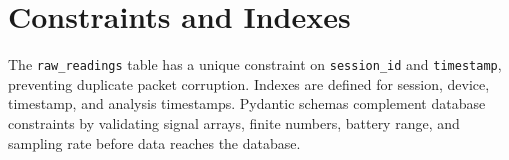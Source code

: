 \section{Constraints and Indexes}

The \texttt{raw\_readings} table has a unique constraint on \texttt{session\_id} and \texttt{timestamp}, preventing duplicate packet corruption. Indexes are defined for session, device, timestamp, and analysis timestamps. Pydantic schemas complement database constraints by validating signal arrays, finite numbers, battery range, and sampling rate before data reaches the database.
